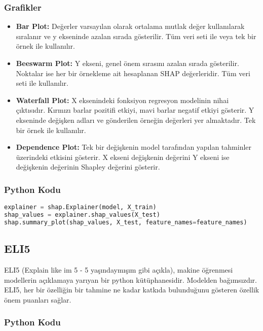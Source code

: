 \subsubsection{Grafikler}

\begin{itemize}
    \item \textbf{Bar Plot:} Değerler varsayılan olarak ortalama mutlak değer kullanılarak sıralanır ve y ekseninde azalan sırada gösterilir. Tüm veri seti ile veya tek bir örnek ile kullanılır.
    \item \textbf{Beeswarm Plot:} Y ekseni, genel önem sırasını azalan sırada gösterilir. Noktalar ise her bir örnekleme ait hesaplanan SHAP değerleridir. Tüm veri seti ile kullanılır.
    \item \textbf{Waterfall Plot:} X eksenindeki fonksiyon regresyon modelinin nihai çıktısıdır. Kırmızı barlar pozitifi etkiyi, mavi barlar negatif etkiyi gösterir. Y ekseninde değişken adları ve gönderilen örneğin değerleri yer almaktadır. Tek bir örnek ile kullanılır.
    \item \textbf{Dependence Plot:} Tek bir değişkenin model tarafından yapılan tahminler üzerindeki etkisini gösterir. X ekseni değişkenin değerini Y ekseni ise değişkenin değerinin Shapley değerini gösterir.
\end{itemize}

\subsubsection{Python Kodu}

\begin{lstlisting}[language=Python]
explainer = shap.Explainer(model, X_train)
shap_values = explainer.shap_values(X_test)
shap.summary_plot(shap_values, X_test, feature_names=feature_names)
\end{lstlisting}

\newpage

\subsection{ELI5}
ELI5 (Explain like im 5 - 5 yaşındaymışım gibi açıkla), makine öğrenmesi modellerin açıklamaya yarıyan bir python kütüphanesidir. Modelden bağımsızdır. ELI5, her bir özelliğin bir tahmine ne kadar katkıda bulunduğunu gösteren özellik önem puanları sağlar.

\subsubsection{Python Kodu}

